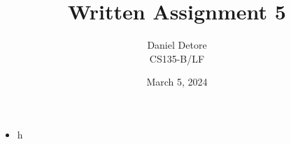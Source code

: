 \documentclass{article}
\title{Written Assignment 5}
\author{Daniel Detore\\CS135-B/LF}
\date{March 5, 2024}
\begin{document}
\maketitle

\section{}
\subsection{}
\begin{itemize}
    \item h
\end{itemize}
\end{document}
